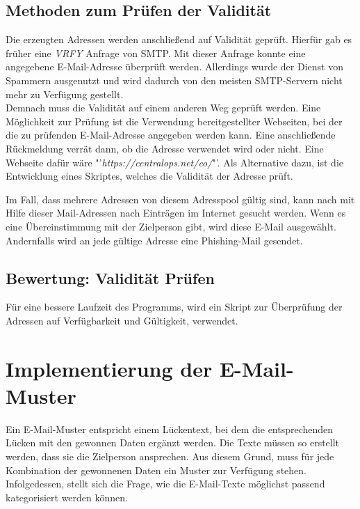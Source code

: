 	\subsection{Methoden zum Prüfen der Validität}
	Die erzeugten Adressen werden anschließend auf Validität geprüft. Hierfür gab es früher eine \textit{VRFY} Anfrage von SMTP. Mit dieser Anfrage konnte eine angegebene E-Mail-Adresse überprüft werden. Allerdings wurde der Dienst von Spammern ausgenutzt und wird dadurch von den meisten SMTP-Servern nicht mehr zu Verfügung gestellt.\cite{balduzzi2010abusing}\\
	Demnach muss die Validität auf einem anderen Weg geprüft werden. Eine Möglichkeit zur Prüfung ist die Verwendung bereitgestellter Webseiten, bei der die zu prüfenden E-Mail-Adresse angegeben werden kann. Eine anschließende Rückmeldung verrät dann, ob die Adresse verwendet wird oder nicht. Eine Webseite dafür wäre "'\textit{https://centralops.net/co/}"'. Als Alternative dazu, ist die Entwicklung eines Skriptes, welches die Validität der Adresse prüft.
	
	Im Fall, dass mehrere Adressen von diesem Adresspool gültig sind, kann nach mit Hilfe dieser Mail-Adressen nach Einträgen im Internet gesucht werden. Wenn es eine Übereinstimmung mit der Zielperson gibt, wird diese E-Mail ausgewählt. Andernfalls wird an jede gültige Adresse eine Phishing-Mail gesendet. 
	
	\subsection{Bewertung: Validität Prüfen}
	Für eine bessere Laufzeit des Programms, wird ein Skript zur Überprüfung der Adressen auf Verfügbarkeit und Gültigkeit, verwendet.	


\section{Implementierung der E-Mail-Muster}
Ein E-Mail-Muster entspricht einem Lückentext, bei dem die entsprechenden Lücken mit den gewonnen Daten ergänzt werden. Die Texte müssen so erstellt werden, dass sie die Zielperson ansprechen. Aus diesem Grund, muss für jede Kombination der gewonnenen Daten ein Muster zur Verfügung stehen. Infolgedessen, stellt sich die Frage, wie die E-Mail-Texte möglichst passend kategorisiert werden können.

